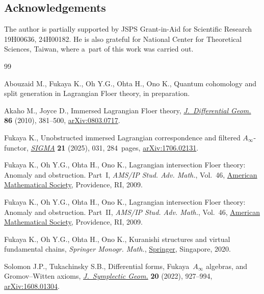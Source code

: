 \documentclass[pdftex]{sigma}
\numberwithin{equation}{section}
\theoremstyle{definition}
\begin{document}
\subsection*{Acknowledgements}
The author is partially supported by JSPS Grant-in-Aid for Scientific Research 19H00636, 24H00182.
He is also grateful for National Center for Theoretical Sciences, Taiwan, where a~part of this work
was carried out.

\begin{thebibliography}{99}
\footnotesize\itemsep=0pt

Abouzaid M., Fukaya K., Oh Y.G., Ohta H., Ono K., Quantum cohomology and split
 generation in {L}agrangian {F}loer theory, {i}n preparation.

Akaho M., Joyce D., Immersed {L}agrangian {F}loer theory,
 \href{https://doi.org/10.4310/jdg/1303219427}{\textit{J.~Differential Geom.}} \textbf{86} (2010), 381--500,
 \href{https://arxiv.org/abs/0803.0717}{arXiv:0803.0717}.

Fukaya K., Unobstructed immersed {L}agrangian correspondence and filtered
 {$A_{\infty}$}-functor, \href{https://doi.org/10.3842/SIGMA.2025.031}{\textit{SIGMA}} \textbf{21} (2025), 031, 284~pages,
\href{https://arxiv.org/abs/1706.02131}{arXiv:1706.02131}.

Fukaya K., Oh Y.G., Ohta H., Ono K., Lagrangian intersection {F}loer theory:
 {A}nomaly and obstruction. {P}art~{I}, \textit{AMS/IP Stud. Adv. Math.},
 Vol.~46, \href{https://doi.org/10.1090/amsip/046.1}{American Mathematical Society}, Providence, RI, 2009.

Fukaya K., Oh Y.G., Ohta H., Ono K., Lagrangian intersection {F}loer theory:
 {A}nomaly and obstruction. {P}art~{II}, \textit{AMS/IP Stud. Adv. Math.},
 Vol.~46, \href{https://doi.org/10.1090/amsip/046.2}{American Mathematical Society}, Providence, RI, 2009.

Fukaya K., Oh Y.G., Ohta H., Ono K., Kuranishi structures and virtual
 fundamental chains, \textit{Springer Monogr. Math.}, \href{https://doi.org/10.1007/978-981-15-5562-6}{Springer}, Singapore, 2020.

Solomon J.P., Tukachinsky S.B., Differential forms, {F}ukaya~{$A_\infty$}
 algebras, and {G}romov--{W}itten axioms, \href{https://doi.org/10.4310/jsg.2022.v20.n4.a5}{\textit{J.~Symplectic Geom.}}
 \textbf{20} (2022), 927--994, \href{https://arxiv.org/abs/1608.01304}{arXiv:1608.01304}.

\end{thebibliography}\LastPageEnding
\end{document}
